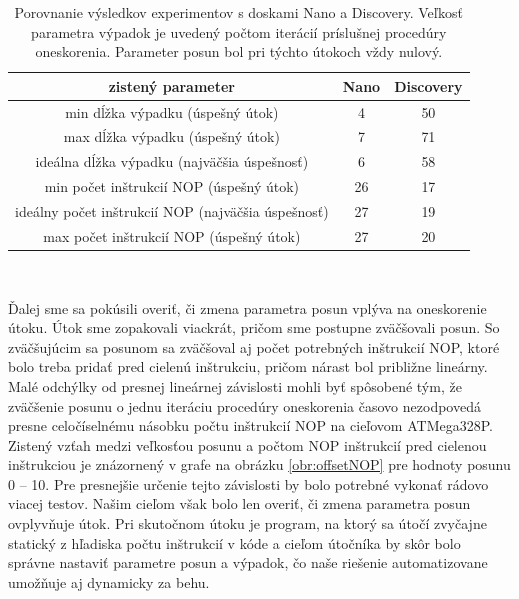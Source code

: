 \begin{table}
    \caption[Porovnanie výsledkov experimentov]{Porovnanie výsledkov experimentov s doskami Nano a Discovery. Veľkosť parametra výpadok je uvedený počtom iterácií príslušnej procedúry oneskorenia. Parameter posun bol pri týchto útokoch vždy nulový.}
    \label{tab:experiments}
    \begin{center}
    \begin{tabular}{|c|c|c|}
        \hline
        zistený parameter & Nano & Discovery \\
        \hline
        min dĺžka výpadku (úspešný útok) & 4 & 50 \\
        \hline
        max dĺžka výpadku (úspešný útok) & 7 & 71 \\
        \hline
        ideálna dĺžka výpadku (najväčšia úspešnosť) & 6 & 58 \\
        \hline
        min počet inštrukcií NOP (úspešný útok) & 26 & 17 \\
        \hline
        ideálny počet inštrukcií NOP (najväčšia úspešnosť) & 27 & 19 \\
        \hline
        max počet inštrukcií NOP (úspešný útok) & 27 & 20 \\
        \hline
    \end{tabular}\\[6pt]
    \end{center}
\end{table}

Ďalej sme sa pokúsili overiť, či zmena parametra posun vplýva na oneskorenie útoku. Útok sme zopakovali viackrát, pričom sme postupne zväčšovali posun. So zväčšujúcim sa posunom sa zväčšoval aj počet potrebných inštrukcií NOP, ktoré bolo treba pridať pred cielenú inštrukciu, pričom nárast bol približne lineárny. Malé odchýlky od presnej lineárnej závislosti mohli byť spôsobené tým, že zväčšenie posunu o jednu iteráciu procedúry oneskorenia časovo nezodpovedá presne celočíselnému násobku počtu inštrukcií NOP na cieľovom ATMega328P. Zistený vzťah medzi veľkosťou posunu a počtom NOP inštrukcií pred cielenou inštrukciou je znázornený v grafe na obrázku \ref{obr:offsetNOP} pre hodnoty posunu 0 -- 10. Pre presnejšie určenie tejto závislosti by bolo potrebné vykonať rádovo viacej testov. Našim cieľom však bolo len overiť, či zmena parametra posun ovplyvňuje útok. Pri skutočnom útoku je program, na ktorý sa útočí zvyčajne statický z hľadiska počtu inštrukcií v kóde a cieľom útočníka by skôr bolo správne nastaviť parametre posun a výpadok, čo naše riešenie automatizovane umožňuje aj dynamicky za behu.

